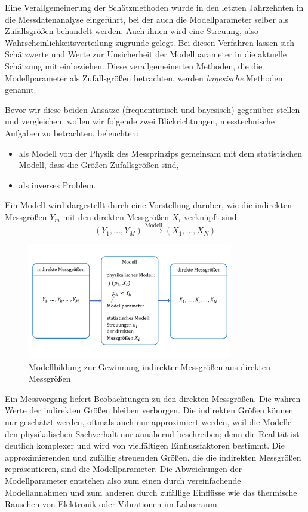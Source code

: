 Eine Verallgemeinerung der Schätzmethoden wurde in den letzten Jahrzehnten
in die Messdatenanalyse eingeführt, bei der auch die Modellparameter selber als
Zufallsgrößen behandelt werden. Auch ihnen wird eine Streuung, also
Wahrscheinlichkeitsverteilung zugrunde gelegt. Bei diesen Verfahren lassen sich
Schätzwerte und Werte zur Unsicherheit der Modellparameter in die aktuelle
Schätzung mit einbeziehen. Diese verallgemeinerten Methoden, die die Modellparameter
als Zufallsgrößen betrachten, werden \textsl{bayesische} Methoden genannt.

Bevor wir diese beiden Ansätze (frequentistisch und bayesisch) gegenüber
stellen und vergleichen, wollen wir folgende
zwei Blickrichtungen, messtechnische Aufgaben zu betrachten, beleuchten:
\begin{itemize}
\item als Modell von der Physik des Messprinzips gemeinsam mit dem statistischen
Modell, dass die Größen Zufallsgrößen sind,
\item als inverses Problem.
\end{itemize}
Ein Modell wird dargestellt durch eine Vorstellung darüber, wie die
indirekten Messgrößen $Y_m$ mit den direkten Messgrößen $X_i$ verknüpft sind:
\begin{equation}
(Y_1, \dots, Y_M) \xrightarrow{\mathrm{Modell}} (X_1, \dots, X_N)
\label{forwardModel}
\end{equation} 
\begin{figure}
\begin{center}
\includegraphics[width=0.8\textwidth, angle = 0]{04_vorlesung/media/Modell1.pdf}
\end{center}
\caption{Modellbildung zur Gewinnung indirekter Messgrößen aus direkten Messgrößen}
\end{figure}

Ein Messvorgang liefert Beobachtungen zu den direkten Messgrößen.
Die wahren Werte der indirekten Größen bleiben verborgen. Die
indirekten Größen können nur geschätzt werden, oftmals auch nur approximiert werden,
weil die Modelle den physikalischen Sachverhalt nur annähernd beschreiben;
denn die Realität ist deutlich komplexer und wird von vielfältigen Einflussfaktoren
bestimmt. Die approximierenden und zufällig streuenden Größen, die die indirekten Messgrößen
repräsentieren, sind die Modellparameter.
Die Abweichungen der Modellparameter entstehen also zum einen
durch vereinfachende Modellannahmen und zum anderen durch zufällige Einflüsse wie das
thermische Rauschen von Elektronik oder Vibrationen im Laborraum.

